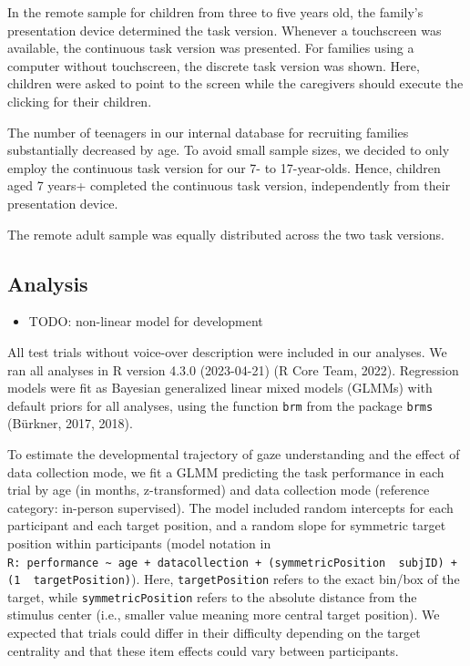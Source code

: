 \documentclass[
  man,floatsintext]{apa6}
\providecommand{\tightlist}{%
  \setlength{\itemsep}{0pt}\setlength{\parskip}{0pt}}
\begin{document}
In the remote sample for children from three to five years old, the family's presentation device determined the task version.
Whenever a touchscreen was available, the continuous task version was presented.
For families using a computer without touchscreen, the discrete task version was shown.
Here, children were asked to point to the screen while the caregivers should execute the clicking for their children.

The number of teenagers in our internal database for recruiting families substantially decreased by age.
To avoid small sample sizes, we decided to only employ the continuous task version for our 7- to 17-year-olds.
Hence, children aged 7 years+ completed the continuous task version, independently from their presentation device.

The remote adult sample was equally distributed across the two task versions.

\hypertarget{analysis}{%
\subsection{Analysis}\label{analysis}}

\begin{itemize}
\tightlist
\item
  TODO: non-linear model for development
\end{itemize}

All test trials without voice-over description were included in our analyses.
We ran all analyses in R version 4.3.0 (2023-04-21) (R Core Team, 2022).
Regression models were fit as Bayesian generalized linear mixed models (GLMMs) with default priors for all analyses, using the function \texttt{brm} from the package \texttt{brms} (Bürkner, 2017, 2018).

To estimate the developmental trajectory of gaze understanding and the effect of data collection mode, we fit a GLMM predicting the task performance in each trial by age (in months, z-transformed) and data collection mode (reference category: in-person supervised).
The model included random intercepts for each participant and each target position, and a random slope for symmetric target position within participants (model notation in \texttt{R:\ performance\ \textasciitilde{}\ age\ +\ datacollection\ +\ (symmetricPosition\ \textbar{}\ subjID)\ +\ (1\ \textbar{}\ targetPosition)}).
Here, \texttt{targetPosition} refers to the exact bin/box of the target, while \texttt{symmetricPosition} refers to the absolute distance from the stimulus center (i.e., smaller value meaning more central target position).
We expected that trials could differ in their difficulty depending on the target centrality and that these item effects could vary between participants.
\end{document}
